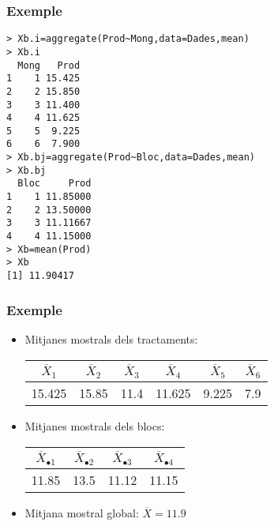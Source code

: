 \documentclass[12pt,t]{beamer}
\theoremstyle{plain}
\theoremstyle{definition}
\begin{document}
\begin{frame}[fragile]
\frametitle{Exemple}\vspace*{-2ex}


\begin{lstlisting}
> Xb.i=aggregate(Prod~Mong,data=Dades,mean)
> Xb.i
  Mong   Prod
1    1 15.425
2    2 15.850
3    3 11.400
4    4 11.625
5    5  9.225
6    6  7.900
> Xb.bj=aggregate(Prod~Bloc,data=Dades,mean)
> Xb.bj
  Bloc     Prod
1    1 11.85000
2    2 13.50000
3    3 11.11667
4    4 11.15000
> Xb=mean(Prod)
> Xb
[1] 11.90417
\end{lstlisting}
\end{frame}

\begin{frame}
\frametitle{Exemple}

\begin{itemize}
\item Mitjanes mostrals dels tractaments:\smallskip

\begin{center}
\begin{tabular}{cccccc}
${\overline{X}_{1}}$ & ${\overline{X}_{2}}$ & ${\overline{X}_{3}}$ & ${\overline{X}_{4}}$ & ${\overline{X}_{5}}$ & ${\overline{X}_{6}}$  \\\hline
15.425 & 15.85 & 11.4 & 11.625&  9.225&  7.9  
\end{tabular}
\end{center}
\smallskip


\item Mitjanes mostrals  dels blocs:

\begin{center}
\begin{tabular}{cccc}
${\overline{X}_{\bullet1}}$ & ${\overline{X}_{\bullet2}}$ & ${\overline{X}_{\bullet3}}$ & ${\overline{X}_{\bullet4}}$   \\\hline
11.85 & 13.5 & 11.12 & 11.15
\end{tabular}
\end{center}
\smallskip


\item Mitjana mostral global: $\overline{X}=11.9$

\end{itemize}
\end{frame}
\end{document}
